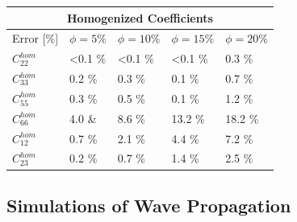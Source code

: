 \begin{center}
\begin{tabular}{ |p{2.5cm}||p{2cm}|p{2cm}|p{2cm}|p{2cm}| }
 \hline
 \multicolumn{5}{|c|}{Homogenized Coefficients} \\
 \hline
 Error [\%] & $\phi = 5 \%$ & $\phi = 10 \%$ & $\phi = 15 \%$ & $\phi = 20 \%$ \\
 \hline
 $C^{hom}_{22}$ & <0.1 \% & <0.1 \% & <0.1 \% & 0.3 \% \\
 $C^{hom}_{33}$ & 0.2 \% & 0.3 \% & 0.1 \% & 0.7 \% \\
 $C^{hom}_{55}$ & 0.3 \% & 0.5 \% & 0.1 \% & 1.2 \% \\
 $C^{hom}_{66}$ & 4.0 \& & 8.6 \% & 13.2 \% & 18.2 \% \\
 $C^{hom}_{12}$ & 0.7 \% & 2.1 \% & 4.4 \% & 7.2 \% \\
 $C^{hom}_{23}$ & 0.2 \% & 0.7 \% & 1.4 \% & 2.5 \% \\
 \hline
\end{tabular}
\end{center}

\subsection{Simulations of Wave Propagation}

